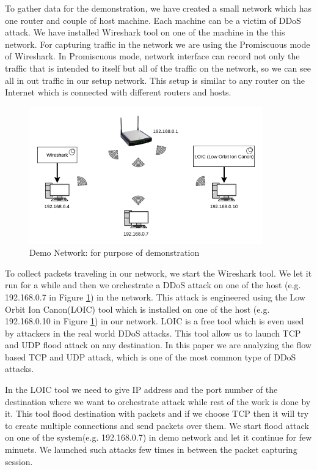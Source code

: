 \documentclass[12pt,oneside,a4paper]{article}
\begin{document}
To gather data for the demonstration, we have created a small network which has one router and couple of host machine. Each machine can be a victim of DDoS attack. We have installed Wireshark tool on one of the machine in the this network. For capturing traffic in the network we are using the Promiscuous mode of Wireshark. In Promiscuous mode, network interface can record not only the traffic that is intended to itself but all of the traffic on the network, so we can see all in out traffic in our setup network. This setup is similar to any router on the Internet which is connected with different routers and hosts.

\begin{figure}[H]
\centering
\includegraphics[width=0.90\textwidth]{demo_network.png}
\caption{Demo Network: for purpose of demonstration} \label{fig:demonetwork}
\end{figure}

To collect packets traveling in our network, we start the Wireshark tool. We let it run for a while and then we orchestrate a DDoS attack on one of the host (e.g. 192.168.0.7 in Figure \ref{fig:demonetwork}) in the network. This attack is engineered using the Low Orbit Ion Canon(LOIC) tool which is installed on one of the host (e.g. 192.168.0.10 in Figure \ref{fig:demonetwork}) in our network. LOIC is a free tool which is even used by attackers in the real world DDoS attacks. This tool allow us to launch TCP and UDP flood attack on any destination. In this paper we are analyzing the flow based TCP and UDP attack, which is one of the most common type of DDoS attacks.

In the LOIC tool we need to give IP address and the port number of the destination where we want to orchestrate attack while rest of the work is done by it. This tool flood destination with packets and if we choose TCP then it will try to create multiple connections and send packets over them. We start flood attack on one of the system(e.g. 192.168.0.7) in demo network and let it continue for few minuets. We launched such attacks few times in between the packet capturing session.
\end{document}
